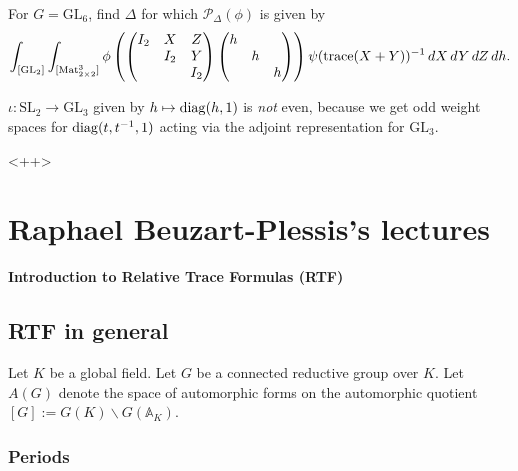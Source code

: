 \documentclass[reqno]{amsart} 
\numberwithin{theorem}{section}
\numberwithin{equation}{section}
\numberwithin{exercise}{section}
\begin{document}
\begin{exercise}\label{exercise:cq6tho3oca}
  For $G = \mathrm{GL}_6$, find $\Delta$ for which $\mathcal{P}_\Delta(\phi)$ is given by
  \begin{equation*}
    \int_{[\mathrm{GL}_2]} \int_{[\operatorname{Mat}_{2 \times 2}^3]} \phi
    \left(
      \begin{pmatrix}
        I_2      & X & Z \\
                 & I_2 & Y \\
                 &  & I_2 \\
      \end{pmatrix}
      \begin{pmatrix}
        h      &  &  \\
               & h &  \\
               &  & h \\
      \end{pmatrix}\right)
    \psi(\operatorname{trace}(X + Y))^{-1}
    \, d X \, d Y \, d Z \, d h.
  \end{equation*}
\end{exercise}

\begin{example}\label{example:cq6tho3m7k}
  $\iota : \mathrm{SL}_2 \rightarrow \mathrm{GL}_3$ given by $h \mapsto \operatorname{diag}(h, 1)$ is \emph{not} even, because we get odd weight spaces for $\operatorname{diag}(t, t^{-1}, 1)$ acting via the adjoint representation for $\mathrm{GL}_3$.
\end{example}<++>

\section{Raphael Beuzart-Plessis's lectures}\label{sec:cq6tho1cgx}
\textbf{Introduction to Relative Trace Formulas (RTF)}

\subsection{RTF in general}\label{sec:cq6tho1blx}

Let $K$ be a global field.  Let $G$ be a connected reductive group over $K$.  Let $A(G)$ denote the space of automorphic forms on the automorphic quotient $[G] := G(K) \backslash G(\mathbb{A}_K)$.

\subsubsection{Periods}\label{sec:cq6tho1auw}
\end{document}
